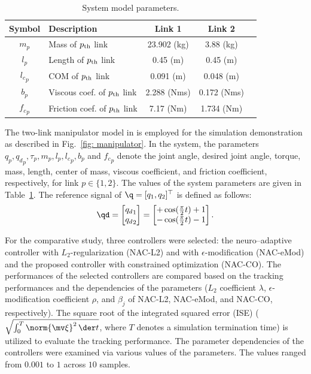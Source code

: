 \documentclass[letterpaper, 10 pt, conference]{ieeeconf}  %
\begin{document}
\begin{table}[!t]
    \renewcommand{\arraystretch}{1.3}
    \caption{System model parameters.}
    \centering
    \begin{tabular}{c m{11em} c c c }
    \hline
    \textbf{Symbol} & \textbf{Description} & \textbf{Link 1} & \textbf{Link 2} \\
    \hline
    \hline 
    $m_p$ & Mass of $p\textsubscript{th}$ link    & 23.902 (kg) & 3.88 (kg) \\
    \hline
    $l_p$  & Length of $p\textsubscript{th}$ link   & 0.45 (m) & 0.45 (m) \\
    \hline
    ${l_c}_p$ & COM of $p\textsubscript{th}$ link  & 0.091 (m) & 0.048 (m) \\
    \hline
    $b_p$   & Viscous coef. of $p\textsubscript{th}$ link  &  2.288 (Nms) & 0.172 (Nms) \\
    \hline
    ${f_c}_p$  & Friction coef. of $p\textsubscript{th}$ link &  7.17 (Nm) & 1.734 (Nm) \\
    \hline
    \end{tabular}
    \label{table: system parameters}
\end{table}

The two-link manipulator model in \cite{Markus:2013aa} is employed for the simulation demonstration as described in Fig.~\ref{fig: manipulator}.
In the system, the parameters $q_p,{q_d}_p,\tau_p,m_p,l_p,{l_c}_p,b_p$ and ${f_c}_p$ denote the joint angle, desired joint angle, torque, mass, length, center of mass, viscous coefficient, and friction coefficient, respectively, for link $p\in\{1,2\}$.
The values of the system parameters are given in Table~\ref{table: system parameters}.
The reference signal of $\q=[q_1,q_2]^\top $ is defined as follows:
\begin{equation}
    \qd
    =
    \begin{bmatrix}
        {q_d}_1\\
        {q_d}_2
    \end{bmatrix}
    = 
    \begin{bmatrix}
        +\cos(
            \tfrac{\pi}{2}t
        ) + 1 \\
        -\cos(
            \tfrac{\pi}{2}t
        ) - 1 
    \end{bmatrix}
    .
\end{equation}

For the comparative study, three controllers were selected: the neuro–adaptive controller with $L_2$-regularization (NAC-L2) and with $\epsilon$-modification (NAC-eMod) and the proposed controller with constrained optimization (NAC-CO).
The performances of the selected controllers are compared based on the tracking performances and the dependencies of the parameters (\ie $L_2$ coefficient $\lambda$, $\epsilon$-modification coefficient $\rho$, and $\beta_j$ of NAC-L2, NAC-eMod, and NAC-CO, respectively).
The square root of the integrated squared error (ISE) (\ie $\sqrt{\int_0^T \norm{\mv \xi}^2\,\der t}$, where $T$ denotes a simulation termination time) is utilized to evaluate the tracking performance.
The parameter dependencies of the controllers were examined via various values of the parameters. 
The values ranged from $0.001$ to $1$ across $10$ samples.
\end{document}
